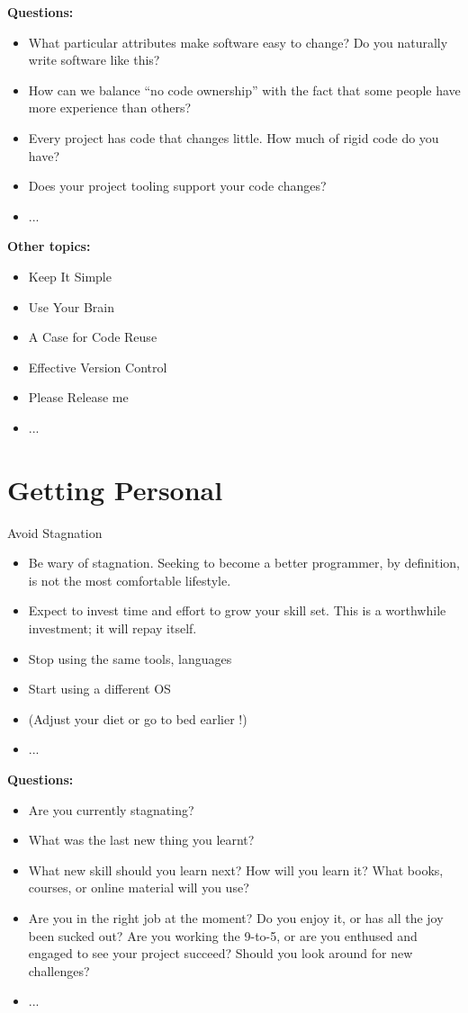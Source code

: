 \documentclass{mypresentation}
\begin{document}
\textbf{Questions:}
\begin{itemize}
\item What particular attributes make software easy to change? Do you naturally write software like this? 
\item How can we balance “no code ownership” with the fact that some people have more experience than others?
\item Every project has code that changes little. How much of rigid code do you have?
\item Does your project tooling support your code changes?
\item ...
\end{itemize}
\newpage

\textbf{Other topics:}
\begin{itemize}
\item Keep It Simple
\item Use Your Brain
\item A Case for Code Reuse
\item Effective Version Control
\item Please Release me
\item ...
\end{itemize}
\newpage

\section{Getting Personal}
Avoid Stagnation
\begin{itemize}
\item Be wary of stagnation. Seeking to become a better programmer, by definition, is not the most comfortable lifestyle.
\item Expect to invest time and effort to grow your skill set. This is a worthwhile investment; it will repay itself.
\item Stop using the same tools, languages
\item Start using a different OS
\item (Adjust your diet or go to bed earlier !)
\item ...
\end{itemize}
\newpage

\textbf{Questions:}
\begin{itemize}
\item Are you currently stagnating? 
\item What was the last new thing you learnt?
\item What new skill should you learn next? How will you learn it? What books, courses, or online material will you use?
\item Are you in the right job at the moment? Do you enjoy it, or has all the joy been sucked out? Are you working the 9-to-5, or are you enthused and engaged to see your project succeed? Should you look around for new challenges?
\item ...
\end{itemize}
\newpage
\end{document}
